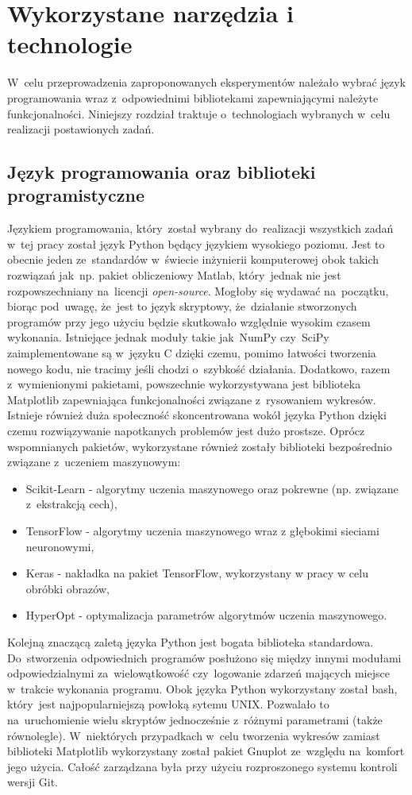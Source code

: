 \section{Wykorzystane narzędzia i technologie} \label{tools}
W~celu przeprowadzenia zaproponowanych eksperymentów należało wybrać język programowania wraz z~odpowiednimi bibliotekami zapewniającymi należyte funkcjonalności. Niniejszy rozdział traktuje o~technologiach wybranych w~celu realizacji postawionych zadań.
\subsection{Język programowania oraz biblioteki programistyczne}
Językiem programowania, który~został wybrany do~realizacji wszystkich zadań w~tej pracy został język Python będący językiem wysokiego poziomu. Jest to obecnie jeden ze~standardów w~świecie inżynierii komputerowej obok takich rozwiązań jak~np. pakiet obliczeniowy Matlab, który~jednak nie jest rozpowszechniany na~licencji \textit{open-source}. Mogłoby się wydawać na~początku, biorąc pod~uwagę, że~jest to język skryptowy, że~działanie stworzonych programów przy jego użyciu będzie skutkowało względnie wysokim czasem wykonania. Istniejące jednak moduły takie jak~NumPy czy~SciPy\cite{scipy} zaimplementowane są w~języku C dzięki czemu, pomimo łatwości tworzenia nowego kodu, nie tracimy jeśli chodzi o~szybkość działania. Dodatkowo, razem z~wymienionymi pakietami, powszechnie wykorzystywana jest biblioteka Matplotlib\cite{matplotlib} zapewniająca funkcjonalności związane z~rysowaniem wykresów. Istnieje również duża społeczność skoncentrowana wokół języka Python dzięki czemu rozwiązywanie napotkanych problemów jest dużo prostsze. Oprócz wspomnianych pakietów, wykorzystane również zostały biblioteki bezpośrednio związane z~uczeniem maszynowym:
\begin{itemize}
\item Scikit-Learn\cite{scikit} - algorytmy uczenia maszynowego oraz pokrewne (np. związane z~ekstrakcją cech),
\item TensorFlow\cite{tensorflow} - algorytmy uczenia maszynowego wraz z głębokimi sieciami neuronowymi,
\item Keras\cite{keras} - nakładka na pakiet TensorFlow, wykorzystany w pracy w celu obróbki obrazów,
\item HyperOpt\cite{hyperopt} - optymalizacja parametrów algorytmów uczenia maszynowego.
\end{itemize}
Kolejną znaczącą zaletą języka Python jest bogata biblioteka standardowa. Do~stworzenia odpowiednich programów posłużono się między innymi modułami odpowiedzialnymi za~wielowątkowość czy~logowanie zdarzeń mających miejsce w~trakcie wykonania programu. Obok języka Python wykorzystany został bash, który~jest najpopularniejszą powłoką sytemu UNIX. Pozwalało to na~uruchomienie wielu skryptów jednocześnie z~różnymi parametrami (także równolegle). W~niektórych przypadkach w~celu tworzenia wykresów zamiast biblioteki Matplotlib wykorzystany został pakiet Gnuplot ze~względu na~komfort jego użycia. Całość zarządzana była przy użyciu rozproszonego systemu kontroli wersji Git.

